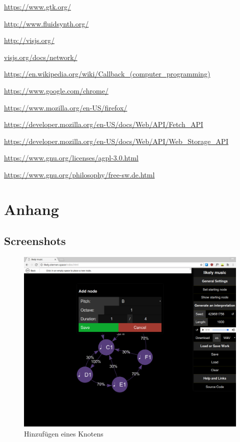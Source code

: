 \documentclass[a4paper,twocolumn]{article}
\begin{document}
\begin{thebibliography}{9}
  \url{https://www.gtk.org/}

  \url{http://www.fluidsynth.org/}

  \url{http://visjs.org/}

  \url{visjs.org/docs/network/}

  \url{https://en.wikipedia.org/wiki/Callback_(computer_programming)}

  \url{https://www.google.com/chrome/}

  \url{https://www.mozilla.org/en-US/firefox/}

  \url{https://developer.mozilla.org/en-US/docs/Web/API/Fetch_API}

  \url{https://developer.mozilla.org/en-US/docs/Web/API/Web_Storage_API}

  \url{https://www.gnu.org/licenses/agpl-3.0.html}

  \url{https://www.gnu.org/philosophy/free-sw.de.html}
\end{thebibliography}

\clearpage
\onecolumn

\section*{Anhang}

\subsection*{Screenshots}
\begin{figure}[H]
  \begin{center}
  \includegraphics[width=.7\textwidth]{screenshots/add-node.png}
  \end{center}
  \caption{Hinzufügen eines Knotens}
\end{figure}
\end{document}
